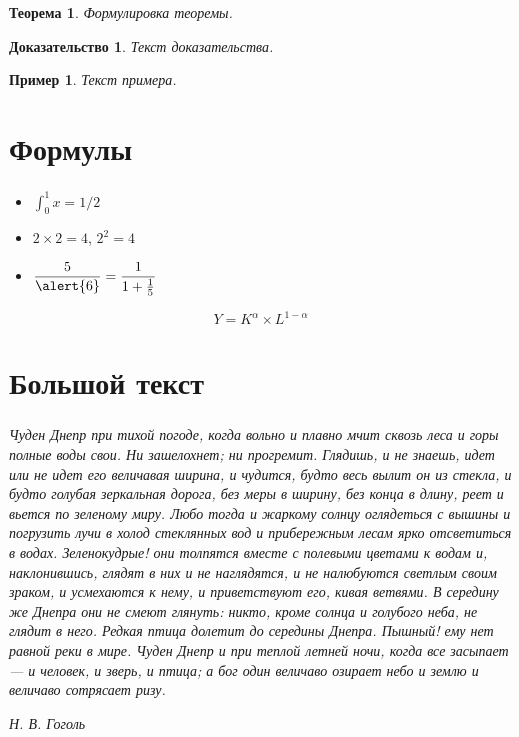 \documentclass[t, dvipsnames]{beamer}  %
\newtheorem{rtheorem}{Теорема}
\newtheorem{rproof}{Доказательство}
\newtheorem{rexample}{Пример}
\begin{document}
\begin{frame}
	\frametitle{\insertsection}
	\framesubtitle{\insertsubsection}
    \begin{rtheorem}
		Формулировка теоремы.    
	\end{rtheorem}
	\begin{rproof}
		Текст доказательства.
    \end{rproof}
	\begin{rexample}
		Текст примера.
	\end{rexample}
\end{frame}

\section{Формулы}

\begin{frame}
	\frametitle{\insertsection}
	\begin{itemize}
		\item $\displaystyle\int_0^1 x=1/2$  
		\item $2\times 2=4$, $2^2=4$ 
		\item $\displaystyle\frac{5}{\alert{6}}=\frac{1}{1+\frac{1}{5}}$ 
	\end{itemize}
	\begin{equation}
	Y=K^\alpha \times L^{1-\alpha}
	\end{equation}
\end{frame}




\section{Большой текст}

\begin{frame}[shrink=70]\label{lab}  %
	\frametitle{\insertsection}
	
	\textsl{Чуден Днепр при тихой погоде, когда вольно и плавно мчит сквозь леса и горы полные воды свои. Ни зашелохнет; ни прогремит. Глядишь, и не знаешь, идет или не идет его величавая ширина, и чудится, будто весь вылит он из стекла, и будто голубая зеркальная дорога, без меры в ширину, без конца в длину, реет и вьется по зеленому миру. Любо тогда и жаркому солнцу оглядеться с вышины и погрузить лучи в холод стеклянных вод и прибережным лесам ярко отсветиться в водах. Зеленокудрые! они толпятся вместе с полевыми цветами к водам и, наклонившись, глядят в них и не наглядятся, и не налюбуются светлым  своим зраком, и усмехаются к нему, и приветствуют его, кивая ветвями. В середину же Днепра они не смеют глянуть: никто, кроме солнца и голубого неба, не глядит в него. Редкая птица долетит до середины Днепра. Пышный! ему нет равной реки в мире. Чуден Днепр и при теплой летней ночи, когда все засыпает --- и человек, и зверь, и птица; а бог один величаво озирает небо и землю и величаво сотрясает ризу.}

	\hfill{\textit{Н. В. Гоголь}}
\end{frame} 
\end{document}
